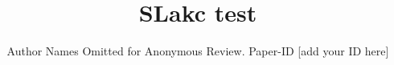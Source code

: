 \documentclass[conference]{IEEEtran}
\begin{document}
\title{SLakc test}

\author{Author Names Omitted for Anonymous Review. Paper-ID [add your ID here]}





% 


\maketitle
\end{document}
